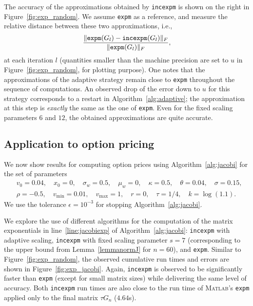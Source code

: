 The accuracy of the approximations obtained by \texttt{incexpm} is
shown on the right in Figure~\ref{fig:exp_random}.  We assume
\texttt{expm} as a reference, and measure the relative distance
between these two approximations, i.e.,
\begin{equation*}
    \frac{\lVert \texttt{expm}(G_l) - \texttt{incexpm}(G_l) \rVert_F}
        {\lVert \texttt{expm}(G_l) \rVert_F},
\end{equation*}
at each iteration $l$ (quantities smaller than the machine precision
are set to $u$ in Figure~\ref{fig:exp_random}, for plotting purpose).  One notes that the
approximations
of the adaptive strategy remain close to \texttt{expm} throughout the
sequence of computations.  An observed drop of the error down to $u$ for this strategy
corresponds to a restart in Algorithm~\ref{alg:adaptive}; the
approximation at this step is \emph{exactly} the same as the one of
\texttt{expm}.  Even for the fixed scaling parameters $6$ and $12$, the
obtained approximations are quite accurate.


\subsection{Application to option pricing}
\label{sec:exp_jacobi}

We now show results for computing option prices using
Algorithm~\ref{alg:jacobi} for the set of parameters 
\begin{align*}
    &v_0=0.04, \quad  x_0=0,\quad \sigma_w=0.5,\quad \mu_w=0,\quad \kappa=0.5,\quad \theta=0.04,\quad \sigma=0.15, 
    \\ &\rho=-0.5,\quad v_\text{min}=0.01,\quad v_\text{max}=1,\quad r=0,\quad \tau=1/4, \quad k=\log(1.1).
\end{align*}
We use the tolerance $\epsilon = 10^{-3}$ for stopping Algorithm~\ref{alg:jacobi}.

We explore the use of different algorithms for the computation of the matrix
exponentials in line~\ref{line:jacobiexp} of
Algorithm~\ref{alg:jacobi}: \texttt{incexpm} with adaptive scaling,
\texttt{incexpm} with fixed scaling parameter $s=7$ (corresponding to
the upper bound from Lemma~\ref{lemmanormJ} for $n = 60$), and
\texttt{expm}. Similar to Figure~\ref{fig:exp_random}, the observed
cumulative run times and errors are shown in
Figure~\ref{fig:exp_jacobi}. Again, \texttt{incexpm} is observed to be
significantly faster than \texttt{expm} (except for small matrix
sizes) while delivering the same level of accuracy.  Both
\texttt{incexpm} run times are also close to the run time of
\textsc{Matlab}'s \texttt{expm} applied only to the final matrix $\tau G_n$
($4.64$s).

